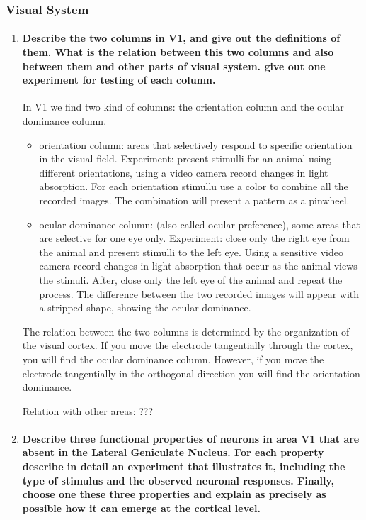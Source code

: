 \documentclass[12pt,article,oneside,a4paper]{memoir}
\begin{document}
\subsubsection{Visual System}\label{sec:visual-system}
\begin{enumerate}
\item \paragraph{Describe the two columns in V1, and give out the definitions of them. What is the relation between this two columns and also between them and other parts of visual system. give out one experiment for testing of each column.}
In V1 we find two kind of columns: the orientation column and the ocular dominance column.
\begin{itemize}
\item orientation column: areas that selectively respond to specific orientation in the visual field. Experiment: present stimulli for an animal using different orientations, using a video camera record changes in light absorption. For each orientation stimullu use a color to combine all the recorded images. The combination will present a pattern as a pinwheel.
\item ocular dominance column: (also called ocular preference), some areas that are selective for one eye only. Experiment: close only the right eye from the animal and present stimulli to the left eye. Using a sensitive video camera record changes in light absorption that occur as the animal views the stimuli. After, close only the left eye of the animal and repeat the process. The difference between the two recorded images will appear with a stripped-shape, showing the ocular dominance.
\end{itemize}

The relation between the two columns is determined by the organization of the visual cortex. If you move the electrode tangentially through the cortex, you will find the ocular dominance column. However, if you move the electrode tangentially in the orthogonal direction you will find the orientation dominance.

Relation with other areas: ???

\item \paragraph{Describe three functional properties of neurons in area V1 that are absent in the Lateral Geniculate Nucleus. For each property describe in detail an experiment that illustrates it, including the type of stimulus and the observed neuronal responses. Finally, choose one these three properties and explain as precisely as possible how it can emerge at the cortical level.}


\end{enumerate}
\end{document}
